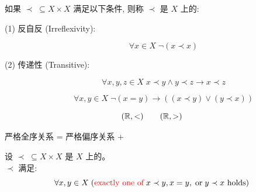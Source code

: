 \begin{frame}{}
  \begin{definition}
    如果 $\prec\; \subseteq X \times X$ 满足以下条件,
    则称 $\prec$ 是 $X$ 上的: \\[6pt]
    \begin{description}
      \item[(1) 反自反 (Irreflexivity):]
        \[
          {\forall x \in X\; \lnot (x \prec x)}
        \]
      \item[(2) 传递性 (Transitive):]
        \[
          \forall x, y, z \in X\; x \prec y \land y \prec z \to x \prec z
        \]
      \item[]
        \[
          \forall x, y \in X\; \lnot (x = y) \to ((x \prec y) \lor (y \prec x))
        \]
    \end{description}
  \end{definition}

  \vspace{-0.20cm}
  \[
    (\mathbb{R}, <) \qquad (\mathbb{R}, >)
  \]
  \pause
  \vspace{-0.50cm}
  \begin{center}
    严格全序关系 = 严格偏序关系 + 
  \end{center}
\end{frame}

%

\begin{frame}{}
  \begin{theorem}
    设 $\prec\; \subseteq X \times X$ 是 $X$ 上的。\\[5pt]
    $\prec$ 满足:
    \[
      \forall x, y \in X\;
        (\text{\textcolor{red}{exactly one of}}\; x \prec y, x = y, \;\text{or}\; y \prec x \text{ holds})
    \]
  \end{theorem}
\end{frame}

